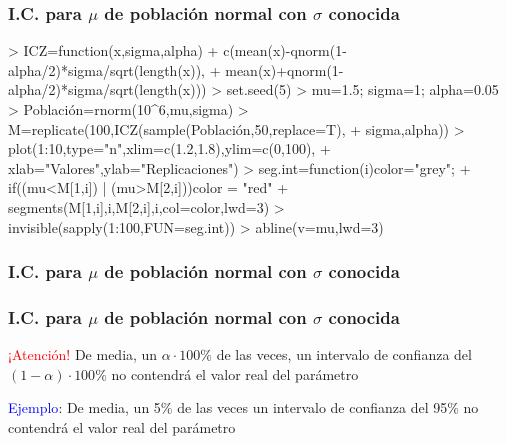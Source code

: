 \documentclass[12pt,t]{beamer}
\newcommand{\red}[1]{\textcolor{red}{#1}}
\newcommand{\blue}[1]{\textcolor{blue}{#1}}
\theoremstyle{plain}
\theoremstyle{definition}
\begin{document}
\begin{frame}[fragile]
\frametitle{I.C. para $\mu$ de población normal con $\sigma$ conocida}
\vspace*{-4ex}

\begin{Schunk}
\begin{Sinput}
> ICZ=function(x,sigma,alpha){
+   c(mean(x)-qnorm(1-alpha/2)*sigma/sqrt(length(x)), 
+   mean(x)+qnorm(1-alpha/2)*sigma/sqrt(length(x)))}
> set.seed(5)
> mu=1.5; sigma=1; alpha=0.05
> Población=rnorm(10^6,mu,sigma)
> M=replicate(100,ICZ(sample(Población,50,replace=T),
+  sigma,alpha))
> plot(1:10,type="n",xlim=c(1.2,1.8),ylim=c(0,100),
+ xlab="Valores",ylab="Replicaciones")
> seg.int=function(i){color="grey";
+   if((mu<M[1,i]) | (mu>M[2,i])){color = "red"}
+   segments(M[1,i],i,M[2,i],i,col=color,lwd=3)}
> invisible(sapply(1:100,FUN=seg.int))
> abline(v=mu,lwd=3)
\end{Sinput}
\end{Schunk}

\end{frame}

\begin{frame}

\frametitle{I.C. para $\mu$ de población normal con $\sigma$ conocida}
\vspace*{-1cm}





\end{frame}

\begin{frame}[fragile]
\frametitle{I.C. para $\mu$ de población normal con $\sigma$ conocida}

\begin{block}{\red{¡Atención!}}
De media, un $\alpha\cdot 100\%$ de las veces, un intervalo de confianza  del $(1-\alpha)\cdot 100\%$  no contendrá el valor real del parámetro 
\end{block}

\blue{Ejemplo}: De media, un 5\% de las veces un intervalo de confianza  del 95\% no contendrá el valor real del parámetro

\end{frame}
\end{document}
